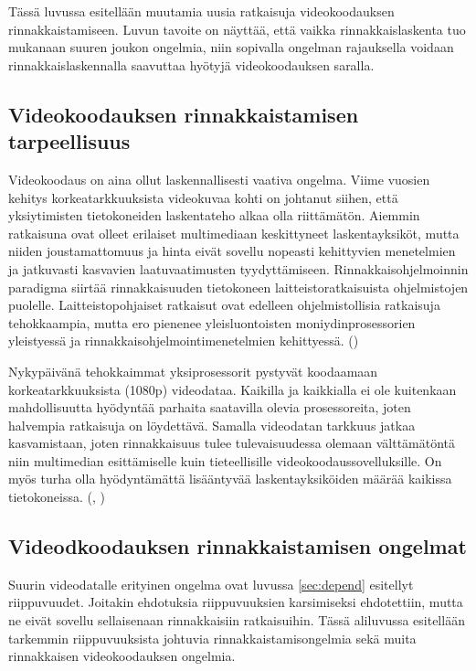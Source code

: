 Tässä luvussa esitellään muutamia uusia ratkaisuja videokoodauksen
rinnakkaistamiseen. Luvun tavoite on näyttää, että vaikka rinnakkaislaskenta
tuo mukanaan suuren joukon ongelmia, niin sopivalla ongelman rajauksella
voidaan rinnakkaislaskennalla saavuttaa hyötyjä videokoodauksen saralla.

\subsection{Videokoodauksen rinnakkaistamisen tarpeellisuus}

Videokoodaus on aina ollut laskennallisesti vaativa ongelma. Viime vuosien
kehitys korkeatarkkuuksista videokuvaa kohti on johtanut siihen, että
yksiytimisten tietokoneiden laskentateho alkaa olla riittämätön.
Aiemmin ratkaisuna ovat olleet erilaiset multimediaan keskittyneet
laskentayksiköt, mutta niiden joustamattomuus ja hinta eivät sovellu nopeasti
kehittyvien menetelmien ja jatkuvasti kasvavien laatuvaatimusten tyydyttämiseen.
Rinnakkaisohjelmoinnin paradigma siirtää rinnakkaisuuden tietokoneen
laitteistoratkaisuista ohjelmistojen puolelle. Laitteistopohjaiset ratkaisut
ovat edelleen ohjelmistollisia ratkaisuja tehokkaampia, mutta ero pienenee
yleisluontoisten moniydinprosessorien yleistyessä ja
rinnakkaisohjelmointimenetelmien kehittyessä. (\citealt{choi})

Nykypäivänä tehokkaimmat yksiprosessorit pystyvät koodaamaan
korkeatarkkuuksista (1080p) videodataa. Kaikilla ja kaikkialla ei ole
kuitenkaan mahdollisuutta hyödyntää parhaita saatavilla olevia prosessoreita,
joten halvempia ratkaisuja on löydettävä. Samalla videodatan tarkkuus jatkaa
kasvamistaan, joten rinnakkaisuus tulee tulevaisuudessa olemaan välttämätöntä
niin multimedian esittämiselle kuin tieteellisille videokoodaussovelluksille.
On myös turha olla hyödyntämättä lisääntyvää laskentayksiköiden määrää kaikissa
tietokoneissa. (\citealt{chi}, \citealt{xu})

\subsection{Videodkoodauksen rinnakkaistamisen ongelmat}
\label{sec:problems}

Suurin videodatalle erityinen ongelma ovat luvussa \ref{sec:depend} esitellyt riippuvuudet.
Joitakin ehdotuksia riippuvuuksien
karsimiseksi ehdotettiin, mutta ne eivät sovellu sellaisenaan rinnakkaisiin
ratkaisuihin. Tässä aliluvussa esitellään tarkemmin riippuvuuksista johtuvia 
rinnakkaistamisongelmia sekä muita rinnakkaisen videokoodauksen ongelmia.

